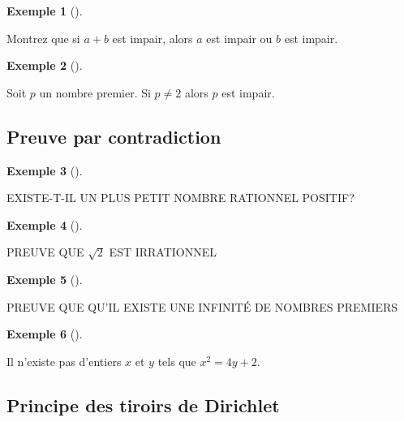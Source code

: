 \documentclass[
  letterpaper,
]{scrbook}
\theoremstyle{plain}
\theoremstyle{definition}
\theoremstyle{definition}
\newtheorem{example}{Exemple}[chapter]
\theoremstyle{remark}
\begin{document}
\begin{example}[]\protect\hypertarget{exm-aplusb-impair-a-b-impair}{}\label{exm-aplusb-impair-a-b-impair}

Montrez que si \(a+b\) est impair, alors \(a\) est impair ou \(b\) est
impair.

\end{example}

\begin{example}[]\protect\hypertarget{exm-nombre-premier-impair}{}\label{exm-nombre-premier-impair}

Soit \(p\) un nombre premier. Si \(p\neq 2\) alors \(p\) est impair.

\end{example}

\hypertarget{preuve-par-contradiction}{%
\subsection{Preuve par contradiction}\label{preuve-par-contradiction}}

\begin{example}[]\protect\hypertarget{exm-plus-petit-nombre-rationnel}{}\label{exm-plus-petit-nombre-rationnel}

EXISTE-T-IL UN PLUS PETIT NOMBRE RATIONNEL POSITIF?

\end{example}

\begin{example}[]\protect\hypertarget{exm-sqrt2-irrationnel}{}\label{exm-sqrt2-irrationnel}

PREUVE QUE \(\sqrt{2}\) EST IRRATIONNEL

\end{example}

\begin{example}[]\protect\hypertarget{exm-infinite-nombres-premiers}{}\label{exm-infinite-nombres-premiers}

PREUVE QUE QU'IL EXISTE UNE INFINITÉ DE NOMBRES PREMIERS

\end{example}

\begin{example}[]\protect\hypertarget{exm-pas-entiers-equation}{}\label{exm-pas-entiers-equation}

Il n'existe pas d'entiers \(x\) et \(y\) tels que \(x^2=4y+2\).

\end{example}

\hypertarget{principe-des-tiroirs-de-dirichlet}{%
\subsection{Principe des tiroirs de
Dirichlet}\label{principe-des-tiroirs-de-dirichlet}}
\end{document}
